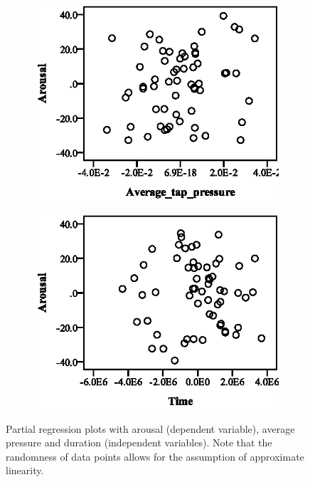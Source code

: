 \begin{figure}[ht]
  \centering
  \begin{subfigure}[b]{0.45\textwidth}
    \centering
    \includegraphics[width=\textwidth]{images/linearity/partialregression/arousal/ArAvgAvg.eps}
    \label{fig:aravgavg}
  \end{subfigure}
  \quad
  \begin{subfigure}[b]{0.45\textwidth}
    \centering
    \includegraphics[width=\textwidth]{images/linearity/partialregression/arousal/ArAvgTime.eps}
    \label{fig:aravgtime}
  \end{subfigure}
  \caption{Partial regression plots with arousal (dependent variable), average pressure and duration (independent variables). Note that the randomness of data points allows for the assumption of approximate linearity.}
\end{figure}